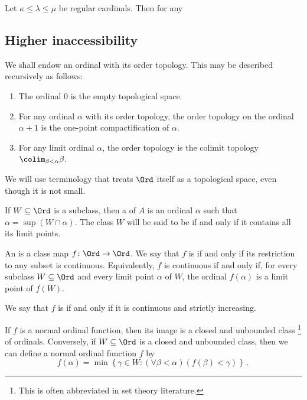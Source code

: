 \begin{eg}
	Let $ \kappa \leq \lambda \leq \mu $ be regular cardinals.
	Then for any 
\end{eg}

\subsection{Higher inaccessibility}%
\label{sub:higher_inaccessibility}

\begin{nul}
	We shall endow an ordinal with its order topology.
	This may be described recursively as follows:
	\begin{enumerate}
		\item The ordinal $ 0 $ is the empty topological space.
		\item For any ordinal $ \alpha $ with its order topology,
			the order topology on the ordinal $ \alpha + 1 $
			is the one-point compactification of $ \alpha $.
		\item For any limit ordinal $ \alpha $,
			the order topology is the colimit topology
			$ \colim_{\beta < \alpha} \beta $.
	\end{enumerate}
\end{nul}

We will use terminology 
that treats $ \Ord $ itself as a topological space,
even though it is not small.

\begin{definition}
	If $ W \subseteq \Ord $ is a subclass,
	then a  of $ A $ is
	an ordinal $ \alpha $ such that $ \alpha = \sup (W \cap \alpha) $.
	The class $ W $ will be said to be  if and only if
	it contains all its limit points.

	An  is a class map $ f \colon \Ord \to \Ord $.
	We say that $ f $ is  if and only if
	its restriction to any subset is continuous.
	Equivalently, $ f $ is continuous if and only if,
	for every subclass $ W \subseteq \Ord $
	and every limit point $ \alpha $ of $ W $,
	the ordinal $ f(\alpha) $ is a limit point of $ f(W) $.

	We say that $ f $ is  if and only if
	it is continuous and strictly increasing.
\end{definition}

\begin{nul}
	If $ f $ is a normal ordinal function,
	then its image is a closed and unbounded class%
	\footnote{This is often abbreviated  in
	set theory literature.}
	of ordinals.
	Conversely, if $ W \subseteq \Ord $ is a closed and unbounded class,
	then we can define a normal ordinal function $ f $ by
	\[
		f(\alpha) = \min \left\{ \gamma \in W : (\forall \beta < \alpha)(f(\beta) < \gamma) \right\} \period
	\]
\end{nul}

